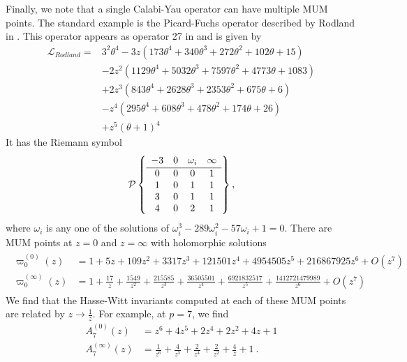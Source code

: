 \documentclass[11pt,leqno]{article}
\theoremstyle{remark}
\theoremstyle{definition}
\begin{document}
Finally, we note that a single Calabi-Yau operator can have multiple MUM points. The standard example is the Picard-Fuchs operator described by Rodland in \cite{1998math......1092R}. This operator appears as operator 27 in \cite{almzud} and is given by
\begin{align*}
    \mathcal{L}_{Rodland}=&3^{2} \theta^4-3 z\left(173\theta^4+340\theta^3+272\theta^2+102\theta+15\right)\\
    &-2 z^{2}\left(1129\theta^4+5032\theta^3+7597\theta^2+4773\theta+1083\right)\\
    &+2 z^{3}\left(843\theta^4+2628\theta^3+2353\theta^2+675\theta+6\right)\\
    &-z  ^{4}\left(295\theta^4+608\theta^3+478\theta^2+174\theta+26\right)\\
    &+z^{5}\left(\theta+1\right)^4
\end{align*}
It has the Riemann symbol
\begin{equation*}
    \mathcal{P}\left\{\begin{array}{c c c c} -3 & 0 & \omega_i & \infty\\[1pt]
    \hline
    0 & 0 & 0 & 1\\
    1 & 0 & 1 & 1\\
    3 & 0 & 1 & 1\\
    4 & 0 & 2 & 1\\
    \end{array}\right\},
\end{equation*}
\noindent where $\omega_i$ is any one of the solutions of $\omega_i^3-289\omega_i^2-57\omega_i+1=0$. There are MUM points at $z=0$ and $z=\infty$ with holomorphic solutions 
\begin{align*}
    \begin{split}
        \varpi_0^{(0)}(z)&=1+5 z+109 z^2+3317 z^3+121501 z^4+4954505
   z^5+216867925 z^6+O\left(z^{7}\right)\\
   \varpi_0^{(\infty)}(z)&=1+ \frac{17}{z}+ \frac{1549}{z^2}+ \frac{215585}{z^3}+ \frac{36505501}{z^4}+
   \frac{6921832517}{z^5}+ \frac{1412721479989}{z^6}+O\left(z^{7}\right)
    \end{split}
\end{align*}
We find that the Hasse-Witt invariants computed at each of these MUM points are related by $z\rightarrow\frac{1}{z}$. For example, at $p=7$, we find
\begin{align*}
    A_7^{(0)}(z)&=z^6+4 z^5+2 z^4+2 z^2+4 z+1\\
    A_7^{(\infty)}(z)&=\frac{1}{z^6}+\frac{4}{z^5}+\frac{2}{z^4}+\frac{2}{z^2}+\frac{4} {z}+1~.
\end{align*}
\end{document}
